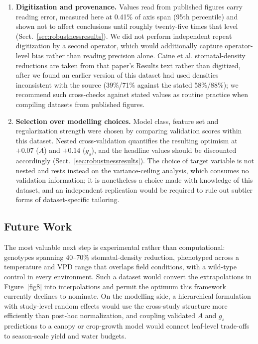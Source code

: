 \documentclass[runningheads]{llncs}
\begin{document}
\begin{enumerate}
    \item \textbf{Digitization and provenance.} Values read from published figures carry reading error, measured here at 0.41\% of axis span (95th percentile) and shown not to affect conclusions until roughly twenty-five times that level (Sect.~\ref{sec:robustnessresults}). We did not perform independent repeat digitization by a second operator, which would additionally capture operator-level bias rather than reading precision alone. Caine et al. stomatal-density reductions are taken from that paper's Results text rather than digitized, after we found an earlier version of this dataset had used densities inconsistent with the source (39\%/71\% against the stated 58\%/88\%); we recommend such cross-checks against stated values as routine practice when compiling datasets from published figures.
    \item \textbf{Selection over modelling choices.} Model class, feature set and regularization strength were chosen by comparing validation scores within this dataset. Nested cross-validation quantifies the resulting optimism at $+0.07$ ($A$) and $+0.14$ ($g_s$), and the headline values should be discounted accordingly (Sect.~\ref{sec:robustnessresults}). The choice of target variable is not nested and rests instead on the variance-ceiling analysis, which consumes no validation information; it is nonetheless a choice made with knowledge of this dataset, and an independent replication would be required to rule out subtler forms of dataset-specific tailoring.
\end{enumerate}

\subsection{Future Work}
The most valuable next step is experimental rather than computational: genotypes spanning 40--70\% stomatal-density reduction, phenotyped across a temperature and VPD range that overlaps field conditions, with a wild-type control in every environment. Such a dataset would convert the extrapolations in Figure~\ref{fig8} into interpolations and permit the optimum this framework currently declines to nominate. On the modelling side, a hierarchical formulation with study-level random effects would use the cross-study structure more efficiently than post-hoc normalization, and coupling validated $A$ and $g_s$ predictions to a canopy or crop-growth model would connect leaf-level trade-offs to season-scale yield and water budgets.
\end{document}
